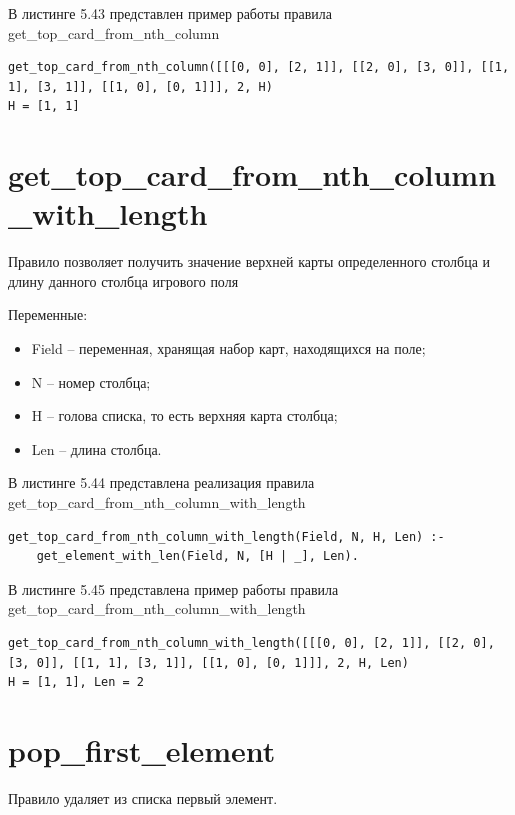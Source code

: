 \documentclass[12pt]{report}
\begin{document}
В листинге 5.43 представлен пример работы правила
\newline
get\_top\_card\_from\_nth\_column

\begin{lstlisting}[label=some-code, caption=пример работы правила get\_top\_card\_from\_nth\_column]
get_top_card_from_nth_column([[[0, 0], [2, 1]], [[2, 0], [3, 0]], [[1, 1], [3, 1]], [[1, 0], [0, 1]]], 2, H)
H = [1, 1]
\end{lstlisting}

\section{get\_top\_card\_from\_nth\_column\_with\_length}
Правило позволяет получить значение верхней карты определенного столбца и длину данного столбца игрового поля

Переменные:
\begin{itemize}
\item Field – переменная, хранящая набор карт, находящихся на поле;
\item N – номер столбца;
\item H – голова списка, то есть верхняя карта столбца;
\item Len – длина столбца.
\end{itemize}

В листинге 5.44 представлена реализация правила \newline get\_top\_card\_from\_nth\_column\_with\_length

\begin{lstlisting}[label=some-code, caption=реализация правила get\_top\_card\_from\_nth\_column\_with\_length]
get_top_card_from_nth_column_with_length(Field, N, H, Len) :- 
    get_element_with_len(Field, N, [H | _], Len).
\end{lstlisting}

В листинге 5.45 представлена пример работы правила \newline get\_top\_card\_from\_nth\_column\_with\_length

\begin{lstlisting}[label=some-code, caption=пример работы правила \newline get\_top\_card\_from\_nth\_column\_with\_length]
get_top_card_from_nth_column_with_length([[[0, 0], [2, 1]], [[2, 0], [3, 0]], [[1, 1], [3, 1]], [[1, 0], [0, 1]]], 2, H, Len)
H = [1, 1], Len = 2
\end{lstlisting}

\section{pop\_first\_element}
Правило удаляет из списка первый элемент.
\end{document}
